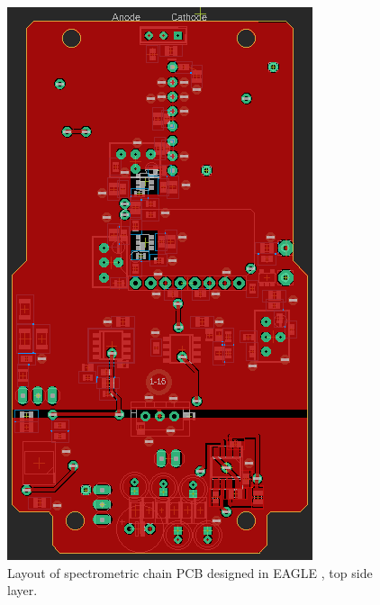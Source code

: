 \newpage

\begin{figure}[H]
 \centering
 \includegraphics[scale=0.8, angle = 90]{./pictures/S14topLay.png}
 \caption{Layout of spectrometric chain PCB designed in EAGLE \cite{eagle}, top side layer.}
 \label{layout top}
 
\end{figure}

